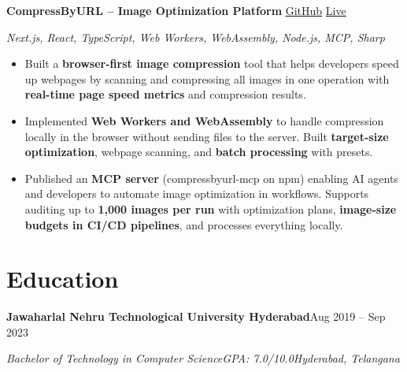 \documentclass[a4paper,10pt]{article}
\newcommand{\resumeSubheading}[4]{%
  \Needspace{5\baselineskip}%
  \textbf{#1}\hfill #2\par
  \textit{#3}\hfill \textit{#4}\par
}
\newcommand{\resumeProjectHeading}[4]{%
  \Needspace{5\baselineskip}%
  \textbf{#1}\hfill
  \href{#2}{\underline{GitHub}}\enspace\textbar\enspace
  \href{#3}{\underline{Live}}\par
  \textit{#4}\par
}
\newenvironment{resumeItems}{%
  \begin{itemize}[leftmargin=14pt,label=\textbullet,
    labelsep=5pt,topsep=3pt,itemsep=3pt,parsep=0pt,partopsep=0pt]
}{\end{itemize}\vspace{3pt}}
\begin{document}
\resumeProjectHeading
  {CompressByURL -- Image Optimization Platform}
  {https://github.com/im-shadowpool/compressbyurl}
  {https://compressbyurl.com/}
  {Next.js, React, TypeScript, Web Workers, WebAssembly, Node.js, MCP, Sharp}
\begin{resumeItems}
  \item Built a \textbf{browser-first image compression} tool that helps developers speed up webpages by scanning and compressing all images in one operation with \textbf{real-time page speed metrics} and compression results.
  \item Implemented \textbf{Web Workers and WebAssembly} to handle compression locally in the browser without sending files to the server. Built \textbf{target-size optimization}, webpage scanning, and \textbf{batch processing} with presets.
  \item Published an \textbf{MCP server} (compressbyurl-mcp on npm) enabling AI agents and developers to automate image optimization in workflows. Supports auditing up to \textbf{1,000 images per run} with optimization plans, \textbf{image-size budgets in CI/CD pipelines}, and processes everything locally.
\end{resumeItems}

\section{Education}
\resumeSubheading
  {Jawaharlal Nehru Technological University Hyderabad}{Aug 2019 -- Sep 2023}
  {Bachelor of Technology in Computer Science\enspace\textbar\enspace GPA: 7.0/10.0}{Hyderabad, Telangana}
\end{document}
